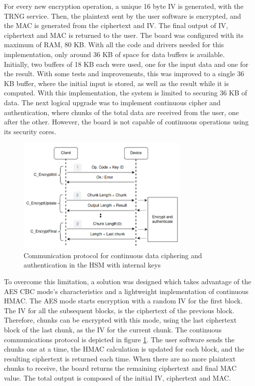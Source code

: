 For every new encryption operation, a unique 16 byte IV is generated, with the TRNG service.
Then, the plaintext sent by the user software is encrypted, and the MAC is generated from the ciphertext and IV. The final output of IV, ciphertext and MAC is returned to the user.
The board was configured with its maximum of RAM, 80 KB. With all the code and drivers needed for this implementation, only around 36 KB of space for data buffers is available. Initially, two buffers of 18 KB each were used, one for the input data and one for the result. With some tests and improvements, this was improved to a single 36 KB buffer, where the initial input is stored, as well as the result while it is computed. With this implementation, the system is limited to securing 36 KB of data. The next logical upgrade was to implement continuous cipher and authentication, where chunks of the total data are received from the user, one after the other. However, the board is not capable of continuous operations using its security cores.
\begin{figure}[h!]
	\centering
	\includegraphics[width=0.75\textwidth]{./Images/data-exchange-chunks.png}
	\caption{Communication protocol for continuous data ciphering and authentication in the HSM with internal keys}
	\label{fig:protocol:data-exchange-chunks}
\end{figure}
To overcome this limitation, a solution was designed which takes advantage of the AES CBC mode's characteristics and a lightweight implementation of continuous HMAC. The AES mode starts encryption with a random IV for the first block. The IV for all the subsequent blocks, is the ciphertext of the previous block. Therefore, chunks can be encrypted with this mode, using the last ciphertext block of the last chunk, as the IV for the current chunk. The continuous communications protocol is depicted in figure \ref{fig:protocol:data-exchange-chunks}. The user software sends the chunks one at a time, the HMAC calculation is updated for each block, and the resulting ciphertext is returned each time. When there are no more plaintext chunks to receive, the board returns the remaining ciphertext and final MAC value. The total output is composed of the initial IV, ciphertext and MAC.
